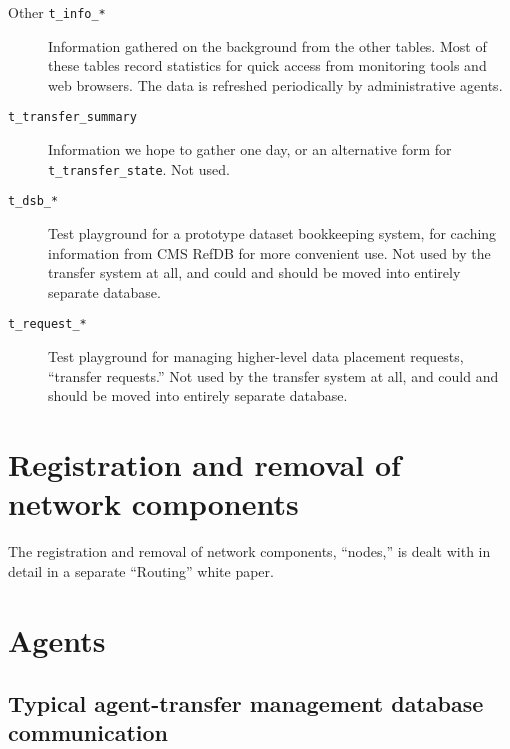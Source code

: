 \documentclass{cmspaper}
\begin{document}
\begin{description}
  \item [Other \texttt{t\_info\_*}]\mbox{}

    Information gathered on the background from the other tables.
    Most of these tables record statistics for quick access from
    monitoring tools and web browsers.  The data is refreshed
    periodically by administrative agents.

  \item [\texttt{t\_transfer\_summary}]\mbox{}
  
    Information we hope to gather one day, or an alternative form
    for \texttt{t\_transfer\_state}.  Not used.

  \item [\texttt{t\_dsb\_*}]\mbox{}
  
    Test playground for a prototype dataset bookkeeping system,
    for caching information from CMS RefDB for more convenient
    use.  Not used by the transfer system at all, and could and
    should be moved into entirely separate database.

  \item [\texttt{t\_request\_*}]\mbox{}
  
    Test playground for managing higher-level data placement
    requests, ``transfer requests.''  Not used by the transfer
    system at all, and could and should be moved into entirely
    separate database.

\end{description}

\section{Registration and removal of network components}

The registration and removal of network components, ``nodes,'' is dealt with in detail in a separate ``Routing'' white paper.

\section{Agents}

\subsection{Typical agent-transfer management database communication}
\end{document}
